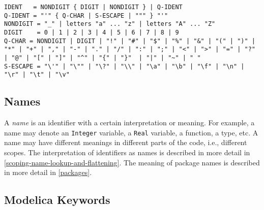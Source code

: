 \begin{lstlisting}[language=grammar,mathescape=false]
IDENT   = NONDIGIT { DIGIT | NONDIGIT } | Q-IDENT
Q-IDENT = "'" { Q-CHAR | S-ESCAPE | """ } "'"
NONDIGIT = "_" | letters "a" ... "z" | letters "A" ... "Z"
DIGIT    = 0 | 1 | 2 | 3 | 4 | 5 | 6 | 7 | 8 | 9
Q-CHAR = NONDIGIT | DIGIT | "!" | "#" | "$" | "%" | "&" | "(" | ")" | "*" | "+" | "," | "-" | "." | "/" | ":" | ";" | "<" | ">" | "=" | "?" | "@" | "[" | "]" | "^" | "{" | "}"  | "|" | "~" | " "
S-ESCAPE = "\'" | "\"" | "\?" | "\\" | "\a" | "\b" | "\f" | "\n" | "\r" | "\t" | "\v"
\end{lstlisting}

\subsection{Names}\label{names}

A \emph{name} is an identifier with a certain interpretation or meaning.
For example, a name may denote an \lstinline!Integer! variable, a \lstinline!Real! variable, a
function, a type, etc. A name may have different meanings in different
parts of the code, i.e., different scopes. The interpretation of
identifiers as names is described in more detail in \cref{scoping-name-lookup-and-flattening}. The
meaning of package names is described in more detail in \cref{packages}.

\subsection{Modelica Keywords}\label{modelica-keywords}

